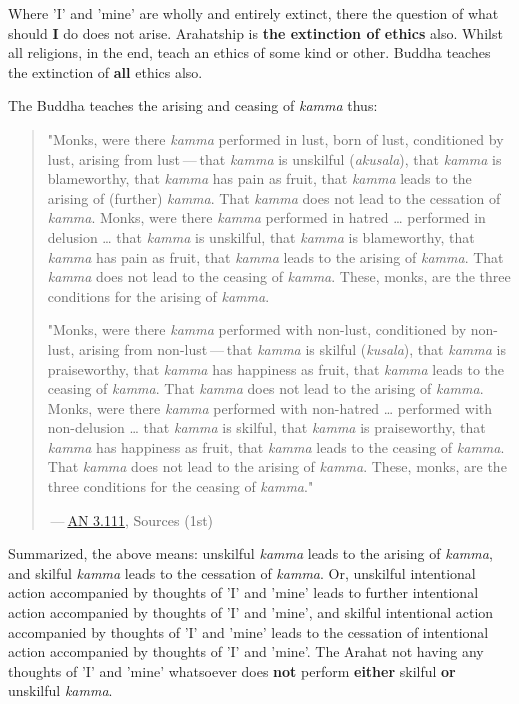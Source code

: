 Where 'I' and 'mine' are wholly and entirely extinct, there the question
of what should \textbf{I} do does not arise. Arahatship is \textbf{the extinction of
ethics} also. Whilst all religions, in the end, teach an ethics of some
kind or other. Buddha teaches the extinction of \textbf{all} ethics also.


The Buddha teaches the arising and ceasing of \emph{kamma} thus:


\begin{quotation}
"Monks, were there \emph{kamma} performed in lust, born of lust, conditioned
by lust, arising from lust — that \emph{kamma} is unskilful (\emph{akusala}),
that \emph{kamma} is blameworthy, that \emph{kamma} has pain as fruit, that
\emph{kamma} leads to the arising of (further) \emph{kamma}. That \emph{kamma} does
not lead to the cessation of \emph{kamma}. Monks, were there \emph{kamma}
performed in hatred … performed in delusion … that \emph{kamma} is unskilful,
that \emph{kamma} is blameworthy, that \emph{kamma} has pain as fruit, that
\emph{kamma} leads to the arising of \emph{kamma}. That \emph{kamma} does not lead to
the ceasing of \emph{kamma}. These, monks, are the three conditions for the
arising of \emph{kamma}.


"Monks, were there \emph{kamma} performed with non-lust, conditioned by
non-lust, arising from non-lust — that \emph{kamma} is skilful (\emph{kusala}),
that \emph{kamma} is praiseworthy, that \emph{kamma} has happiness as fruit, that
\emph{kamma} leads to the ceasing of \emph{kamma}. That \emph{kamma} does not lead to
the arising of \emph{kamma}. Monks, were there \emph{kamma} performed with
non-hatred … performed with non-delusion … that \emph{kamma} is skilful, that
\emph{kamma} is praiseworthy, that \emph{kamma} has happiness as fruit, that
\emph{kamma} leads to the ceasing of \emph{kamma}. That \emph{kamma} does not lead to
the arising of \emph{kamma}. These, monks, are the three conditions for the
ceasing of \emph{kamma}."


 — \href{https://suttacentral.net/an3.111/en/sujato}{AN 3.111}, Sources (1st)


\end{quotation}

Summarized, the above means: unskilful \emph{kamma} leads to the arising of
\emph{kamma}, and skilful \emph{kamma} leads to the cessation of \emph{kamma}. Or,
unskilful intentional action accompanied by thoughts of 'I' and 'mine'
leads to further intentional action accompanied by thoughts of 'I' and
'mine', and skilful intentional action accompanied by thoughts of 'I'
and 'mine' leads to the cessation of intentional action accompanied by
thoughts of 'I' and 'mine'. The Arahat not having any thoughts of 'I'
and 'mine' whatsoever does \textbf{not} perform \textbf{either} skilful \textbf{or} unskilful
\emph{kamma}.


